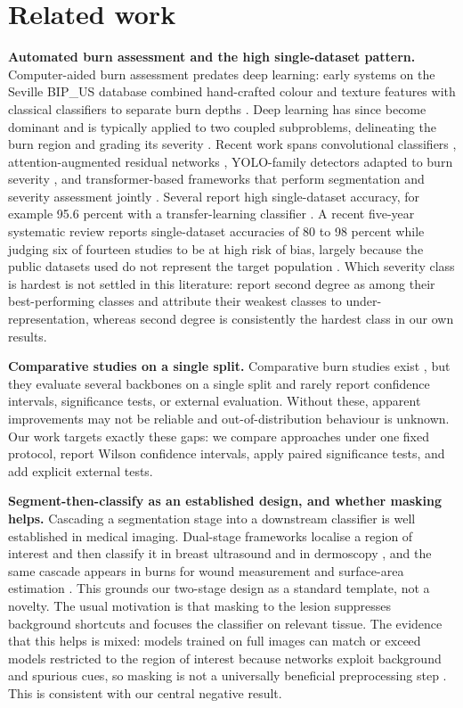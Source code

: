 \documentclass{melba}
\begin{document}
\section{Related work}
\label{Rel}
\textbf{Automated burn assessment and the high single-dataset pattern.} Computer-aided burn assessment predates deep learning: early systems on the Seville BIP\_US database combined hand-crafted colour and texture features with classical classifiers to separate burn depths \citep{acha}. Deep learning has since become dominant and is typically applied to two coupled subproblems, delineating the burn region and grading its severity \citep{boissin}. Recent work spans convolutional classifiers \citep{suha}, attention-augmented residual networks \citep{yadav2023}, YOLO-family detectors adapted to burn severity \citep{ferdinand,yildiz}, and transformer-based frameworks that perform segmentation and severity assessment jointly \citep{nadeem}. Several report high single-dataset accuracy, for example 95.6 percent with a transfer-learning classifier \citep{suha}. A recent five-year systematic review reports single-dataset accuracies of 80 to 98 percent while judging six of fourteen studies to be at high risk of bias, largely because the public datasets used do not represent the target population \citep{fu2026review}. Which severity class is hardest is not settled in this literature: \citet{nadeem} report second degree as among their best-performing classes and attribute their weakest classes to under-representation, whereas second degree is consistently the hardest class in our own results.

\textbf{Comparative studies on a single split.} Comparative burn studies exist \citep{rahman,chang2023}, but they evaluate several backbones on a single split and rarely report confidence intervals, significance tests, or external evaluation. Without these, apparent improvements may not be reliable and out-of-distribution behaviour is unknown. Our work targets exactly these gaps: we compare approaches under one fixed protocol, report Wilson confidence intervals, apply paired significance tests, and add explicit external tests.

\textbf{Segment-then-classify as an established design, and whether masking helps.} Cascading a segmentation stage into a downstream classifier is well established in medical imaging. Dual-stage frameworks localise a region of interest and then classify it in breast ultrasound \citep{bruno} and in dermoscopy \citep{almasni2020}, and the same cascade appears in burns for wound measurement and surface-area estimation \citep{chang2021}. This grounds our two-stage design as a standard template, not a novelty. The usual motivation is that masking to the lesion suppresses background shortcuts and focuses the classifier on relevant tissue. The evidence that this helps is mixed: models trained on full images can match or exceed models restricted to the region of interest because networks exploit background and spurious cues, so masking is not a universally beneficial preprocessing step \citep{sourget}. This is consistent with our central negative result.
\end{document}
